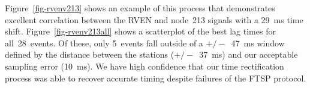 Figure~\ref{fig-rvenv213} shows an example of this process that demonstrates
excellent correlation between the RVEN and node~213 signals with a 29~ms time
shift. Figure~\ref{fig-rvenv213all} shows a scatterplot of the best lag times
for all~28~events.  Of these, only 5~events fall outside of a $+/-$~47~ms
window defined by the distance between the stations ($+/-$~37~ms) and our
acceptable sampling error (10~ms). We have high confidence that our
time rectification process was able to recover accurate timing despite
failures of the FTSP protocol.


